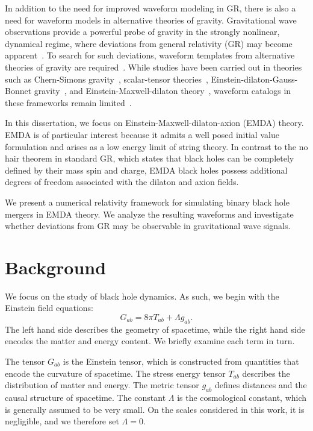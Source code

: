 In addition to the need for improved waveform modeling in GR, there is also a need for waveform models in alternative theories of gravity. Gravitational wave observations provide a powerful probe of gravity in the strongly nonlinear, dynamical regime, where deviations from general relativity (GR) may become apparent~\cite{Abbott2016,Abbott2025GWTC3GR,Yunes2025GWTests}. To search for such deviations, waveform templates from alternative theories of gravity are required~\cite{Yunes2009,Nair2019,Berti2015}. While studies have been carried out in theories such as Chern-Simons gravity~\cite{Alexander2009,Okounkova2019}, scalar-tensor theories~\cite{Barausse2013,Shibata2013,Berti2013,Palenzuela2014}, Einstein-dilaton-Gauss-Bonnet gravity~\cite{Witek2019,Ripley2020b,East2021,Okounkova:2020rqw,Elley2022,Doneva2023sGB}, and Einstein-Maxwell-dilaton theory~\cite{Hirschmann2018,Julie2017}, waveform catalogs in these frameworks remain limited~\cite{Cardoso2012NRHEP,Held2025}.


In this dissertation, we focus on Einstein-Maxwell-dilaton-axion (EMDA) theory. EMDA is of particular interest because it admits a well posed initial value formulation and arises as a low energy limit of string theory. In contrast to the no hair theorem in standard GR, which states that black holes can be completely defined by their mass spin and charge,  EMDA black holes possess additional degrees of freedom associated with the dilaton and axion fields.

We present a numerical relativity framework for simulating binary black hole mergers in EMDA theory. We analyze the resulting waveforms and investigate whether deviations from GR may be observable in gravitational wave signals.

\section{Background}
We focus on the study of black hole dynamics. As such, we begin with the Einstein field equations:
\begin{equation}
    G_{ab} = 8 \pi T_{ab} + \Lambda g_{ab}.
\end{equation}
The left hand side describes the geometry of spacetime, while the right hand side encodes the matter and energy content.\cite{Wald1984,DInverno1992} We briefly examine each term in turn.

The tensor $G_{ab}$ is the Einstein tensor, which is constructed from quantities that encode the curvature of spacetime. The stress energy tensor $T_{ab}$ describes the distribution of matter and energy. The metric tensor $g_{ab}$ defines distances and the causal structure of spacetime. The constant $\Lambda$ is the cosmological constant, which is generally assumed to be very small. On the scales considered in this work, it is negligible, and we therefore set $\Lambda = 0$.

